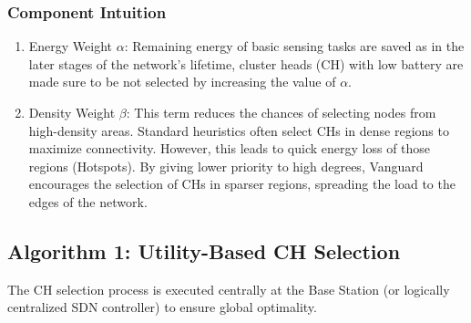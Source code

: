 \documentclass[conference]{IEEEtran}
\begin{document}
\subsubsection{Component Intuition}
\begin{enumerate}
    \item Energy Weight $\alpha$: Remaining energy of basic sensing tasks are saved as in the later stages of the network's lifetime, cluster heads (CH) with low battery are made sure to be not selected by increasing the value of $\alpha$.
    \item Density Weight $\beta$: This term reduces the chances of selecting nodes from high-density areas. Standard heuristics often select CHs in dense regions to maximize connectivity. However, this leads to quick energy loss of those regions (Hotspots). By giving lower priority to high degrees, Vanguard encourages the selection of CHs in sparser regions, spreading the load to the edges of the network.
\end{enumerate}

\subsection{Algorithm 1: Utility-Based CH Selection}
The CH selection process is executed centrally at the Base Station (or logically centralized SDN controller) to ensure global optimality.

\begin{figure}[htbp]
\centering
{}
\end{figure}
\end{document}
